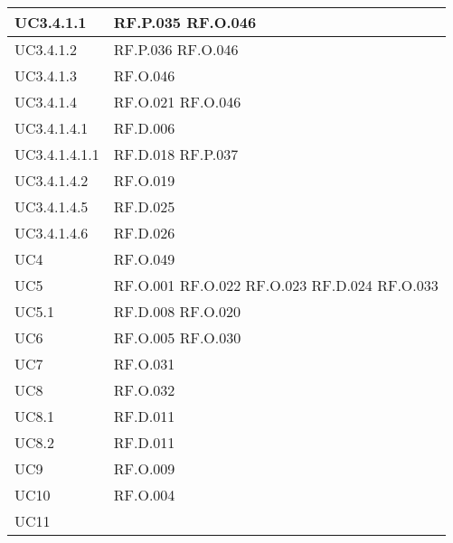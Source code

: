\begin{table}[H]
\centering
    \begin{tabular}{|C{3.0cm}|C{3.0cm}|}
        \hline
        UC3.4.1.1 &
        RF.P.035 \newline
        RF.O.046 \\
        \hline
        UC3.4.1.2 &
        RF.P.036 \newline
        RF.O.046 \\
        \hline
        UC3.4.1.3 &
        RF.O.046 \\
        \hline
        UC3.4.1.4 &
        RF.O.021 \newline
        RF.O.046 \\
        \hline
        UC3.4.1.4.1 &
        RF.D.006 \\
        \hline
        UC3.4.1.4.1.1 &
        RF.D.018 \newline
        RF.P.037 \\
        \hline
        UC3.4.1.4.2 &
        RF.O.019 \\
        \hline
        UC3.4.1.4.5 &
        RF.D.025 \\
        \hline
        UC3.4.1.4.6 &
        RF.D.026 \\
        \hline
        UC4 &
        RF.O.049 \\
        \hline
        UC5 &
        RF.O.001 \newline
        RF.O.022 \newline
        RF.O.023 \newline
        RF.D.024 \newline
        RF.O.033 \\
        \hline
        UC5.1 &
        RF.D.008 \newline
        RF.O.020 \\
        \hline
        UC6 &
        RF.O.005 \newline
        RF.O.030 \\
        \hline
        UC7 &
        RF.O.031 \\
        \hline
        UC8 &
        RF.O.032 \\
        \hline
        UC8.1 &
        RF.D.011 \\
        \hline
        UC8.2 &
        RF.D.011 \\
        \hline
        UC9 &
        RF.O.009 \\
        \hline
        UC10 &
        RF.O.004 \\
        \hline
        UC11 &

\end{tabular}
\end{table}
